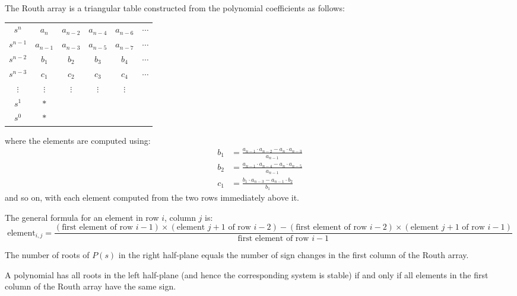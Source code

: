 \begin{definition}
The Routh array is a triangular table constructed from the polynomial coefficients as follows:

\begin{center}
\begin{tabular}{c|ccccc}
$s^n$ & $a_n$ & $a_{n-2}$ & $a_{n-4}$ & $a_{n-6}$ & $\cdots$ \\
$s^{n-1}$ & $a_{n-1}$ & $a_{n-3}$ & $a_{n-5}$ & $a_{n-7}$ & $\cdots$ \\
$s^{n-2}$ & $b_1$ & $b_2$ & $b_3$ & $b_4$ & $\cdots$ \\
$s^{n-3}$ & $c_1$ & $c_2$ & $c_3$ & $c_4$ & $\cdots$ \\
$\vdots$ & $\vdots$ & $\vdots$ & $\vdots$ & $\vdots$ & \\
$s^1$ & $*$ & & & & \\
$s^0$ & $*$ & & & & \\
\end{tabular}
\end{center}

where the elements are computed using:
\begin{align}
b_1 &= \frac{a_{n-1} \cdot a_{n-2} - a_n \cdot a_{n-3}}{a_{n-1}} \\
b_2 &= \frac{a_{n-1} \cdot a_{n-4} - a_n \cdot a_{n-5}}{a_{n-1}} \\
c_1 &= \frac{b_1 \cdot a_{n-3} - a_{n-1} \cdot b_2}{b_1}
\end{align}
and so on, with each element computed from the two rows immediately above it.
\end{definition}

The general formula for an element in row $i$, column $j$ is:
\begin{equation}
\text{element}_{i,j} = \frac{(\text{first element of row } i-1) \times (\text{element } j+1 \text{ of row } i-2) - (\text{first element of row } i-2) \times (\text{element } j+1 \text{ of row } i-1)}{\text{first element of row } i-1}
\end{equation}

\begin{theorem}
\label{thm:routh}
The number of roots of $P(s)$ in the right half-plane equals the number of sign changes in the first column of the Routh array.
\end{theorem}

\begin{corollary}
A polynomial has all roots in the left half-plane (and hence the corresponding system is stable) if and only if all elements in the first column of the Routh array have the same sign.
\end{corollary}

